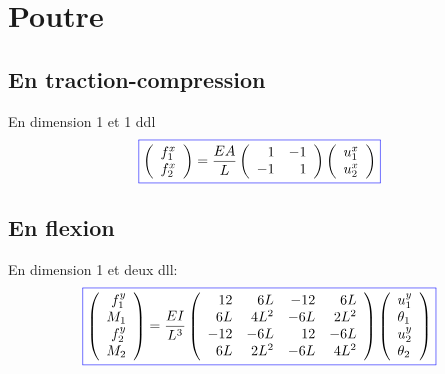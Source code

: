 \documentclass[a4paper]{article}
\newcommand{\myredbox}[1]{\fcolorbox{blue}{white}{$\displaystyle#1$}}
\begin{document}
 \section{Poutre}
 \subsection{En traction-compression}
 En dimension 1 et 1 ddl
\[\myredbox{\left(\begin{array}{r} 
f_{1}^x\\f_{2}^x
\end{array}\right)=\frac{EA}{L}\left(\begin{array}{rr} 
1&-1\\-1&1
\end{array}\right) \left(\begin{array}{l} 
u_{1}^x\\u_{2}^x
\end{array}\right)} 
\]


  \subsection{En flexion}
 En dimension 1 et deux dll:
\[\myredbox{\left(\begin{array}{r} 
f_{1}^y\\M_1\\f_{2}^y\\M_2
\end{array}\right)=\frac{EI}{L^3}\left(\begin{array}{rrrr} 
12&6L&-12&6L\\
6L&4L^2&-6L&2L^2\\
-12&-6L&12&-6L\\
6L&2L^2&-6L&4L^2
\end{array}\right) \left(\begin{array}{l} 
u_{1}^y\\\theta_1\\u_{2}^y\\\theta_2
\end{array}\right)} 
\]
\end{document}
